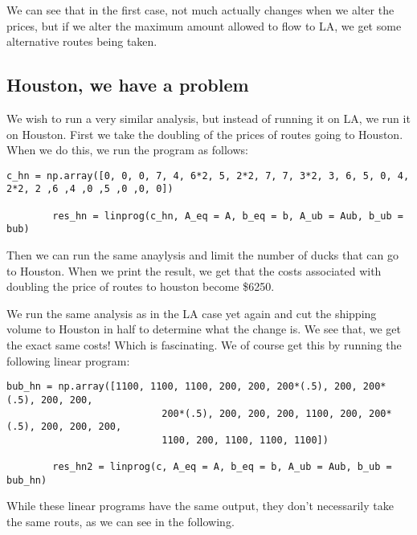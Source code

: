 \documentclass[11pt]{article}
\begin{document}
    We can see that in the first case, not much actually changes when we alter the
    prices, but if we alter the maximum amount allowed to flow to LA, we get some
    alternative routes being taken.

    \newpage
    \subsection{Houston, we have a problem}

    We wish to run a very similar analysis, but instead of running it on LA, we
    run it on Houston. First we take the doubling of the prices of routes going
    to Houston. When we do this, we run the program as follows:

    \begin{lstlisting}[style=mystyle, gobble=8]
        c_hn = np.array([0, 0, 0, 7, 4, 6*2, 5, 2*2, 7, 7, 3*2, 3, 6, 5, 0, 4, 2*2, 2 ,6 ,4 ,0 ,5 ,0 ,0, 0])
        
        res_hn = linprog(c_hn, A_eq = A, b_eq = b, A_ub = Aub, b_ub = bub)
    \end{lstlisting}

    Then we can run the same anaylysis and limit the number of ducks that can
    go to Houston. When we print the result, we get that the costs associated
    with doubling the price of routes to houston become \$6250.

    We run the same analysis as in the LA case yet again and cut the shipping
    volume to Houston in half to determine what the change is. We see that, we
    get the exact same costs! Which is fascinating. We of course get this by
    running the following linear program:

    \begin{lstlisting}[style=mystyle, gobble=8]
        bub_hn = np.array([1100, 1100, 1100, 200, 200, 200*(.5), 200, 200*(.5), 200, 200, 
                           200*(.5), 200, 200, 200, 1100, 200, 200*(.5), 200, 200, 200, 
                           1100, 200, 1100, 1100, 1100])
           
        res_hn2 = linprog(c, A_eq = A, b_eq = b, A_ub = Aub, b_ub = bub_hn)
    \end{lstlisting}

    While these linear programs have the same output, they don't necessarily
    take the same routs, as we can see in the following.
\end{document}

